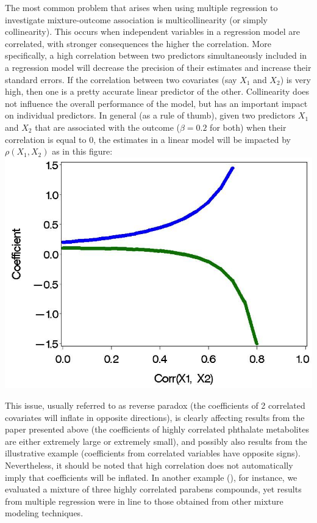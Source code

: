 \documentclass[
]{book}
\begin{document}
The most common problem that arises when using multiple regression to investigate mixture-outcome association is multicollinearity (or simply collinearity). This occurs when independent variables in a regression model are correlated, with stronger consequences the higher the correlation. More specifically, a high correlation between two predictors simultaneously included in a regression model will decrease the precision of their estimates and increase their standard errors. If the correlation between two covariates (say \(X_1\) and \(X_2\)) is very high, then one is a pretty accurate linear predictor of the other. Collinearity does not influence the overall performance of the model, but has an important impact on individual predictors. In general (as a rule of thumb), given two predictors \(X_1\) and \(X_2\) that are associated with the outcome (\(\beta=0.2\) for both) when their correlation is equal to 0, the estimates in a linear model will be impacted by \(\rho(X_1, X_2)\) as in this figure:
\includegraphics{images/revparadox.png}

This issue, usually referred to as reverse paradox (the coefficients of 2 correlated covariates will inflate in opposite directions), is clearly affecting results from the paper presented above (the coefficients of highly correlated phthalate metabolites are either extremely large or extremely small), and possibly also results from the illustrative example (coefficients from correlated variables have opposite signs). Nevertheless, it should be noted that high correlation does not automatically imply that coefficients will be inflated. In another example (\citet{bellavia2019urinary}), for instance, we evaluated a mixture of three highly correlated parabens compounds, yet results from multiple regression were in line to those obtained from other mixture modeling techniques.
\end{document}

